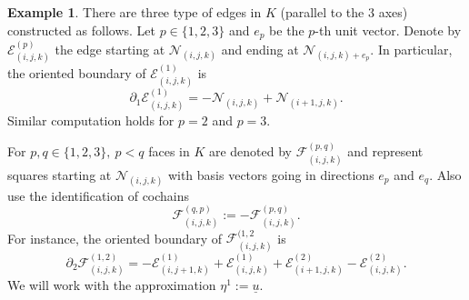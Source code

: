 \documentclass[fleqn]{article}
\theoremstyle{definition}
\newtheorem{example}[theorem]{Example}
\begin{document}
\begin{example}
  There are three type of edges in $K$ (parallel to the $3$ axes)
  constructed as follows.
  Let $p \in \{1, 2, 3\}$ and $e_p$ be the $p$-th unit vector.
  Denote by $\mathcal{E}^{(p)}_{(i, j, k)}$ the edge starting at
  $\mathcal{N}_{(i, j, k)}$ and ending at $\mathcal{N}_{(i, j, k) + e_p}$.
  In particular, the oriented boundary of $\mathcal{E}^{(1)}_{(i, j, k)}$ is
  \begin{equation}
    \partial_1 \mathcal{E}^{(1)}_{(i, j, k)} =
    - \mathcal{N}_{(i, j, k)} + \mathcal{N}_{(i + 1, j, k)}.
  \end{equation}
  Similar computation holds for $p = 2$ and $p = 3$.

  For $p, q \in \{1, 2, 3\},\ p < q$ faces in $K$ are denoted by
  $\mathcal{F}^{(p, q)}_{(i, j, k)}$ and represent squares starting at
  $\mathcal{N}_{(i, j, k)}$ with basis vectors going in directions
  $e_p$ and $e_q$.
  Also use the identification of cochains
  \begin{equation}
    \mathcal{F}^{(q, p)}_{(i, j, k)} := -\mathcal{F}^{(p, q)}_{(i, j, k)}.
  \end{equation}
  For instance, the oriented boundary of $\mathcal{F}^{(1, 2}_{(i, j, k)}$ is
  \begin{equation}
    \partial_2 \mathcal{F}^{(1, 2)}_{(i, j, k)} =
    - \mathcal{E}^{(1)}_{(i, j + 1, k)}
    + \mathcal{E}^{(1)}_{(i, j, k)}
    + \mathcal{E}^{(2)}_{(i + 1, j, k)}
    - \mathcal{E}^{(2)}_{(i, j, k)}.
  \end{equation}
  We will work with the approximation $\eta^1 := \underline{u}$.


\end{example}
\end{document}
